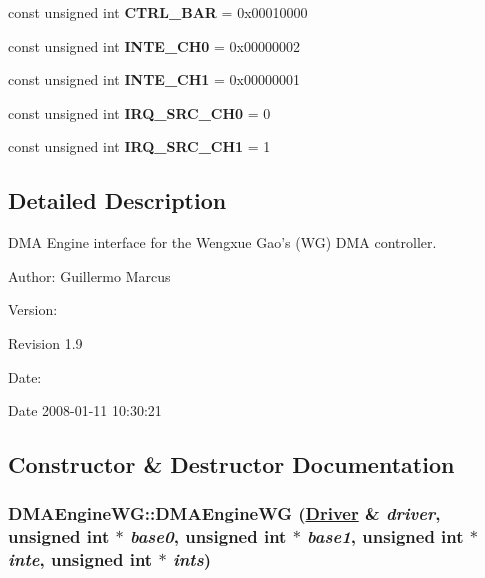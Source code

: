 \begin{CompactItemize}
\item 
\hypertarget{classmprace_1_1DMAEngineWG_t11}{
const unsigned int {\bf CTRL\_\-BAR} = 0x00010000}
\label{classmprace_1_1DMAEngineWG_t11}

\item 
\hypertarget{classmprace_1_1DMAEngineWG_t12}{
const unsigned int {\bf INTE\_\-CH0} = 0x00000002}
\label{classmprace_1_1DMAEngineWG_t12}

\item 
\hypertarget{classmprace_1_1DMAEngineWG_t13}{
const unsigned int {\bf INTE\_\-CH1} = 0x00000001}
\label{classmprace_1_1DMAEngineWG_t13}

\item 
\hypertarget{classmprace_1_1DMAEngineWG_t14}{
const unsigned int {\bf IRQ\_\-SRC\_\-CH0} = 0}
\label{classmprace_1_1DMAEngineWG_t14}

\item 
\hypertarget{classmprace_1_1DMAEngineWG_t15}{
const unsigned int {\bf IRQ\_\-SRC\_\-CH1} = 1}
\label{classmprace_1_1DMAEngineWG_t15}

\end{CompactItemize}


\subsection{Detailed Description}
DMA Engine interface for the Wengxue Gao's (WG) DMA controller. 

\begin{Desc}
\item[Author:]Guillermo Marcus \end{Desc}
\begin{Desc}
\item[Version:]\begin{Desc}
\item[Revision]1.9 \end{Desc}
\end{Desc}
\begin{Desc}
\item[Date:]\begin{Desc}
\item[Date]2008-01-11 10:30:21 \end{Desc}
\end{Desc}




\subsection{Constructor \& Destructor Documentation}
\hypertarget{classmprace_1_1DMAEngineWG_a0}{
\subsubsection[DMAEngineWG]{\setlength{\rightskip}{0pt plus 5cm}DMAEngine\-WG::DMAEngine\-WG (\hyperlink{classmprace_1_1Driver}{Driver} \& {\em driver}, unsigned int $\ast$ {\em base0}, unsigned int $\ast$ {\em base1}, unsigned int $\ast$ {\em inte}, unsigned int $\ast$ {\em ints})}}
\label{classmprace_1_1DMAEngineWG_a0}



